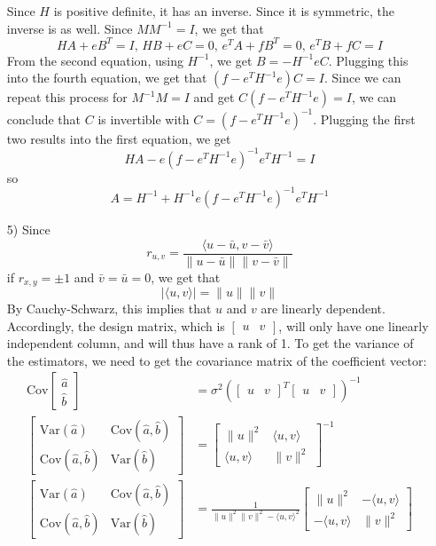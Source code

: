 \documentclass[11pt]{article}
\newcommand{\var}{\mathrm{Var}}
\newcommand{\cov}{\mathrm{Cov}}
\theoremstyle{definition}
\begin{document}
\begin{itemize}
        Since $H$ is positive definite, it has an inverse. Since it is symmetric, the inverse is as well. Since \(MM^{-1}=I\), we get that
        \[HA+eB^T=I, \, HB+eC=0, \, e^TA+fB^T=0, \, e^TB+fC=I\]
        From the second equation, using $H^{-1}$, we get \(B=-H^{-1}eC\). Plugging this into the fourth equation, we get that \((f-e^TH^{-1}e)C=I\). Since we can repeat this process for \(M^{-1}M=I\) and get \(C(f-e^TH^{-1}e)=I\), we can conclude that $C$ is invertible with \(C=(f-e^TH^{-1}e)^{-1}\). Plugging the first two results into the first equation, we get
        \[HA-e(f-e^TH^{-1}e)^{-1}e^TH^{-1}=I\]
        so
        \[A=H^{-1} + H^{-1}e(f-e^TH^{-1}e)^{-1}e^TH^{-1}\]
    \item[5)]
        Since 
        \[r_{u,v}=\frac{\langle u - \bar u, v -\bar v\rangle}{\|u-\bar u\|\|v-\bar v\|} \]
        if \(r_{x,y}=\pm 1\) and \(\bar v = \bar u = 0\), we get that
        \[\vert\langle u, v\rangle\vert = \|u\|\|v\| \]
        By Cauchy-Schwarz, this implies that \(u\) and \(v\) are linearly dependent. Accordingly, the design matrix, which is \( [\begin{array}{cc}u & v\end{array}]\), will only have one linearly independent column, and will thus have a rank of 1.
        \smallskip
        To get the variance of the estimators, we need to get the covariance matrix of the coefficient vector:
        \begin{align*}
            \cov\left[\begin{array}{c}\hat a \\ \hat b \end{array}\right] &= \sigma^2\left([\begin{array}{cc}u & v\end{array}]^T[\begin{array}{cc}u & v\end{array}]\right)^{-1} \\
            \left[\begin{array}{cc} \var(\hat a) & \cov(\hat a,\hat b) \\ \cov(\hat a,\hat b) & \var(\hat b) \end{array} \right] &= \left[\begin{array}{cc} \|u\|^2 & \langle u, v \rangle \\ \langle u, v \rangle & \|v\|^2 \end{array} \right]^{-1} \\
            \left[\begin{array}{cc} \var(\hat a) & \cov(\hat a,\hat b) \\ \cov(\hat a,\hat b) & \var(\hat b) \end{array} \right] &= \frac{1}{\|u\|^2\|v\|^2-\langle u, v \rangle^2} \left[\begin{array}{cc} \|u\|^2 & -\langle u, v \rangle \\ -\langle u, v \rangle & \|v\|^2 \end{array} \right] \\

\end{align*}
\end{itemize}
\end{document}
